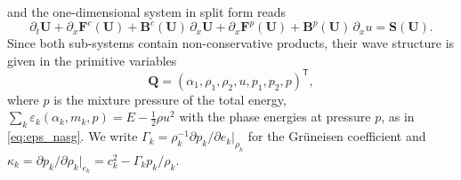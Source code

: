 and the one-dimensional system in split form reads
\begin{equation}
\partial_t\mathbf U+\partial_x\mathbf F^c(\mathbf U)+\mathbf B^c(\mathbf U)\,\partial_x\mathbf U+\partial_x\mathbf F^p(\mathbf U)+\mathbf B^p(\mathbf U)\,\partial_xu=\mathbf S(\mathbf U).
\label{eq:split}
\end{equation}
Since both sub-systems contain non-conservative products, their wave structure is given in the primitive variables
\begin{equation}
\mathbf Q=(\alpha_1,\rho_1,\rho_2,u,p_1,p_2,p)^{\mathsf T},
\label{eq:primitive}
\end{equation}
where $p$ is the mixture pressure of the total energy, $\sum_k\varepsilon_k(\alpha_k,m_k,p)=E-\tfrac12\rho u^2$ with the phase energies at pressure $p$,
as in \eqref{eq:eps_nasg}. We write $\Gamma_k=\rho_k^{-1}\partial p_k/\partial e_k|_{\rho_k}$ for the Gr\"uneisen coefficient and
$\kappa_k=\partial p_k/\partial\rho_k|_{e_k}=c_k^2-\Gamma_kp_k/\rho_k$.

